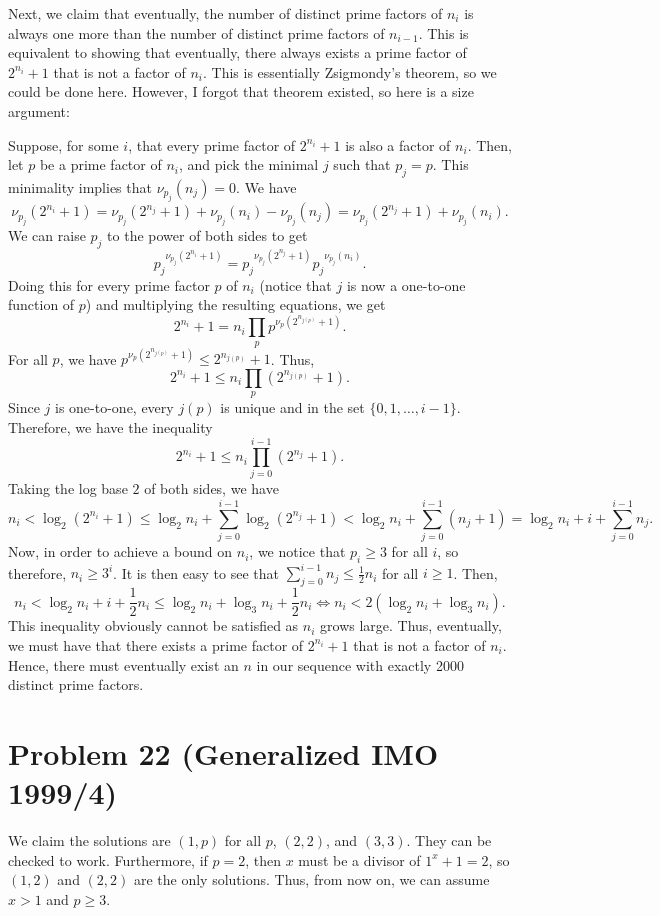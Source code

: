 \documentclass{scrartcl}
\begin{document}
Next, we claim that eventually, the number of distinct prime factors of $n_i$ is always one more than the number of distinct prime factors of $n_{i-1}$. This is equivalent to showing that eventually, there always exists a prime factor of $2^{n_i} + 1$ that is not a factor of $n_i$. This is essentially Zsigmondy's theorem, so we could be done here. However, I forgot that theorem existed, so here is a size argument:

Suppose, for some $i$, that every prime factor of $2^{n_i} + 1$ is also a factor of $n_i$.
Then, let $p$ be a prime factor of $n_i$, and pick the minimal $j$ such that $p_j = p$. This minimality implies that $\nu_{p_j}(n_j) = 0$.
We have
\[ \nu_{p_j}(2^{n_i} + 1) = \nu_{p_j}(2^{n_j} + 1) + \nu_{p_j}(n_i) - \nu_{p_j}(n_j) = \nu_{p_j}(2^{n_j} + 1) + \nu_{p_j}(n_i). \]
We can raise $p_j$ to the power of both sides to get 
\[ {p_j}^{\nu_{p_j}(2^{n_i} + 1)} = {p_j}^{\nu_{p_j}(2^{n_j} + 1)} {p_j}^{\nu_{p_j}(n_i)}. \]
Doing this for every prime factor $p$ of $n_i$ (notice that $j$ is now a one-to-one function of $p$) and multiplying the resulting equations, we get
\[ 2^{n_i} + 1 = n_i \prod_p p^{\nu_p(2^{n_{j(p)}} + 1)}. \]
For all $p$, we have $p^{\nu_p(2^{n_{j(p)}} + 1)} \leq 2^{n_{j(p)}} + 1$. Thus,
\[ 2^{n_i} + 1 \leq n_i \prod_p (2^{n_{j(p)}} + 1). \]
Since $j$ is one-to-one, every $j(p)$ is unique and in the set $\{0, 1, \ldots, i-1\}$. Therefore, we have the inequality
\[ 2^{n_i} + 1 \leq n_i \prod_{j=0}^{i-1} (2^{n_j} + 1). \]
Taking the log base $2$ of both sides, we have
\[ n_i < \log _2 (2^{n_i} + 1) \leq \log _2 n_i + \sum _{j=0}^{i-1} \log_2(2^{n_j} + 1) < \log_2 n_i + \sum _{j=0}^{i-1} (n_j + 1) = \log_2 n_i + i + \sum_{j=0}^{i-1}n_j. \]
Now, in order to achieve a bound on $n_i$, we notice that $p_i \geq 3$ for all $i$, so therefore, $n_i \geq 3^i$. It is then easy to see that $\sum_{j=0}^{i-1}n_j \leq \frac12 n_i$ for all $i \geq 1$. Then,
\[ n_i < \log_2 n_i + i + \frac12 n_i \leq \log_2 n_i + \log_3 n_i + \frac12 n_i \iff n_i < 2(\log _2 n_i + \log _3 n_i). \]
This inequality obviously cannot be satisfied as $n_i$ grows large. Thus, eventually, we must have that there exists a prime factor of $2^{n_i} + 1$ that is not a factor of $n_i$. Hence, there must eventually exist an $n$ in our sequence with exactly 2000 distinct prime factors.

\section*{Problem 22 (Generalized IMO 1999/4)}
We claim the solutions are $(1,p)$ for all $p$, $(2,2)$, and $(3,3)$. They can be checked to work. Furthermore, if $p=2$, then $x$ must be a divisor of $1^x + 1 = 2$, so $(1,2)$ and $(2,2)$ are the only solutions. Thus, from now on, we can assume $x > 1$ and $p \geq 3$.
\end{document}
